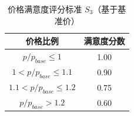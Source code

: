 \begin{table}[h]
\centering
\caption{价格满意度评分标准 $S_3$（基于基准价）}
\begin{tabular}{|c|c|}
\hline
价格比例 & 满意度分数 \\
\hline
$p / p_{base} \leq 1$ & 1.00 \\
$1 < p / p_{base} \leq 1.1$ & 0.90 \\
$1.1 < p / p_{base} \leq 1.2$ & 0.75 \\
$p / p_{base} > 1.2$ & 0.60 \\
\hline
\end{tabular}
\end{table}